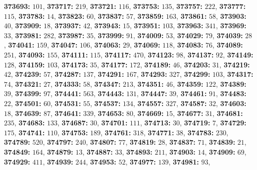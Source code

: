 \textsf{\bfseries 373693:} $101$, \textsf{\bfseries 373717:} $219$, \textsf{\bfseries 373721:} $116$, \textsf{\bfseries 373753:} $135$, \textsf{\bfseries 373757:} $222$, \textsf{\bfseries 373777:} $115$, \textsf{\bfseries 373783:} $14$, \textsf{\bfseries 373823:} $60$, \textsf{\bfseries 373837:} $57$, \textsf{\bfseries 373859:} $163$, \textsf{\bfseries 373861:} $58$, \textsf{\bfseries 373903:} $40$, \textsf{\bfseries 373909:} $18$, \textsf{\bfseries 373937:} $42$, \textsf{\bfseries 373943:} $15$, \textsf{\bfseries 373951:} $103$, \textsf{\bfseries 373963:} $341$, \textsf{\bfseries 373969:} $33$, \textsf{\bfseries 373981:} $282$, \textsf{\bfseries 373987:} $35$, \textsf{\bfseries 373999:} $91$, \textsf{\bfseries 374009:} $53$, \textsf{\bfseries 374029:} $79$, \textsf{\bfseries 374039:} $28$, \textsf{\bfseries 374041:} $159$, \textsf{\bfseries 374047:} $106$, \textsf{\bfseries 374063:} $29$, \textsf{\bfseries 374069:} $118$, \textsf{\bfseries 374083:} $76$, \textsf{\bfseries 374089:} $251$, \textsf{\bfseries 374093:} $155$, \textsf{\bfseries 374111:} $115$, \textsf{\bfseries 374117:} $470$, \textsf{\bfseries 374123:} $98$, \textsf{\bfseries 374137:} $92$, \textsf{\bfseries 374149:} $128$, \textsf{\bfseries 374159:} $103$, \textsf{\bfseries 374173:} $35$, \textsf{\bfseries 374177:} $172$, \textsf{\bfseries 374189:} $46$, \textsf{\bfseries 374203:} $31$, \textsf{\bfseries 374219:} $42$, \textsf{\bfseries 374239:} $57$, \textsf{\bfseries 374287:} $137$, \textsf{\bfseries 374291:} $167$, \textsf{\bfseries 374293:} $327$, \textsf{\bfseries 374299:} $103$, \textsf{\bfseries 374317:} $74$, \textsf{\bfseries 374321:} $27$, \textsf{\bfseries 374333:} $58$, \textsf{\bfseries 374347:} $213$, \textsf{\bfseries 374351:} $46$, \textsf{\bfseries 374359:} $122$, \textsf{\bfseries 374389:} $39$, \textsf{\bfseries 374399:} $97$, \textsf{\bfseries 374441:} $563$, \textsf{\bfseries 374443:} $131$, \textsf{\bfseries 374447:} $39$, \textsf{\bfseries 374461:} $91$, \textsf{\bfseries 374483:} $22$, \textsf{\bfseries 374501:} $60$, \textsf{\bfseries 374531:} $55$, \textsf{\bfseries 374537:} $134$, \textsf{\bfseries 374557:} $327$, \textsf{\bfseries 374587:} $32$, \textsf{\bfseries 374603:} $18$, \textsf{\bfseries 374639:} $87$, \textsf{\bfseries 374641:} $339$, \textsf{\bfseries 374653:} $80$, \textsf{\bfseries 374669:} $15$, \textsf{\bfseries 374677:} $31$, \textsf{\bfseries 374681:} $235$, \textsf{\bfseries 374683:} $133$, \textsf{\bfseries 374687:} $30$, \textsf{\bfseries 374701:} $111$, \textsf{\bfseries 374713:} $30$, \textsf{\bfseries 374719:} $7$, \textsf{\bfseries 374729:} $175$, \textsf{\bfseries 374741:} $110$, \textsf{\bfseries 374753:} $189$, \textsf{\bfseries 374761:} $318$, \textsf{\bfseries 374771:} $38$, \textsf{\bfseries 374783:} $230$, \textsf{\bfseries 374789:} $520$, \textsf{\bfseries 374797:} $240$, \textsf{\bfseries 374807:} $77$, \textsf{\bfseries 374819:} $28$, \textsf{\bfseries 374837:} $71$, \textsf{\bfseries 374839:} $21$, \textsf{\bfseries 374849:} $164$, \textsf{\bfseries 374879:} $13$, \textsf{\bfseries 374887:} $33$, \textsf{\bfseries 374893:} $211$, \textsf{\bfseries 374903:} $14$, \textsf{\bfseries 374909:} $69$, \textsf{\bfseries 374929:} $411$, \textsf{\bfseries 374939:} $244$, \textsf{\bfseries 374953:} $52$, \textsf{\bfseries 374977:} $139$, \textsf{\bfseries 374981:} $93$, 
